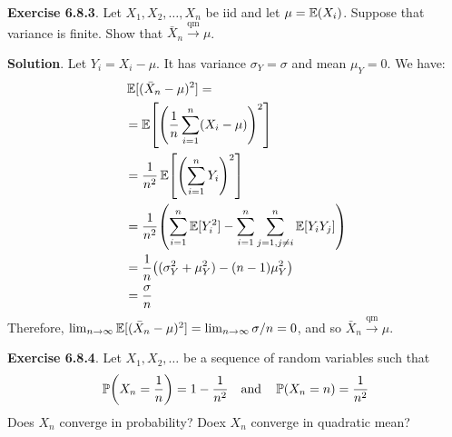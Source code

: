 \textbf{Exercise 6.8.3}. Let \(X_{1}, X_{2}, \dots, X_{n}\) be iid and let
\(\mu = \operatorname{\mathbb{E}}(X_{i})\). Suppose that variance is finite. Show that
\(\bar{X}_{n} \xrightarrow{\text{qm}} \mu\).

\textbf{Solution}.
Let \(Y_{i} = X_{i} - \mu\). It has variance \(\sigma_Y = \sigma\) and mean
\(\mu_Y = 0\). We have:
\begin{align*}
& \EXP[(\bar{X}_{n} - \mu)^{2}] = \\
& = \EXP\left[\left(\frac{1}{n} \sum_{i=1}^{n} (X_{i} - \mu) \right)^{2}\right] \\
& = \frac{1}{n^{2}} \EXP \left[ \left(\sum_{i=1}^{n} Y_{i} \right)^{2} \right] \\
& = \frac{1}{n^{2}} \left( \sum_{i=1}^{n} \EXP[Y_{i}^{2}] - \sum_{i=1}^{n} \sum_{j=1, j \neq i}^{n} \EXP[Y_{i} Y_{j}] \right) \\
& = \frac{1}{n} \left( (\sigma_Y^{2} + \mu_Y^{2}) - (n-1) \mu_Y^{2} \right) \\
& = \frac{\sigma}{n}
\end{align*}
Therefore,
\(\lim _{n \rightarrow \infty} \operatorname{\mathbb{E}}[(\bar{X}_{n} - \mu)^{2}] = \lim _{n \rightarrow \infty} \sigma / n = 0\),
and so \(\bar{X}_{n} \xrightarrow{\text{qm}} \mu\).

\textbf{Exercise 6.8.4}. Let \(X_{1}, X_{2}, \dots\) be a sequence of random
variables such that
\begin{align*}\PROB\left(X_{n} = \frac{1}{n}\right) = 1 - \frac{1}{n^{2}}
\quad\mathrm{and}\quad 
\PROB\left(X_{n} = n\right) = \frac{1}{n^{2}}
\end{align*}
Does \(X_{n}\) converge in probability? Doex \(X_{n}\) converge in quadratic
mean?

